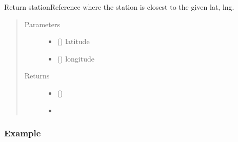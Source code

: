 \documentclass[letterpaper,10pt,english]{sphinxmanual}
\begin{document}

\begin{fulllineitems}
\label{\detokenize{index:flood_tool.get_closest_station_ref_from_lat_lng}}
\sphinxAtStartPar
Return stationReference where the station is
closest to the given lat, lng.
\begin{quote}\begin{description}
\item[{Parameters}] \leavevmode\begin{itemize}
\item {} 
\sphinxAtStartPar
{} () \textendash{} latitude

\item {} 
\sphinxAtStartPar
{} () \textendash{} longitude

\end{itemize}

\item[{Returns}] \leavevmode
\sphinxAtStartPar
\begin{itemize}
\item {} 
\sphinxAtStartPar
{} ()

\item {} 
\sphinxAtStartPar
{}

\end{itemize}


\end{description}\end{quote}
\subsubsection*{Example}

\begin{sphinxVerbatim}[commandchars=\\\{\}]
   
\end{sphinxVerbatim}

\end{fulllineitems}
\end{document}
